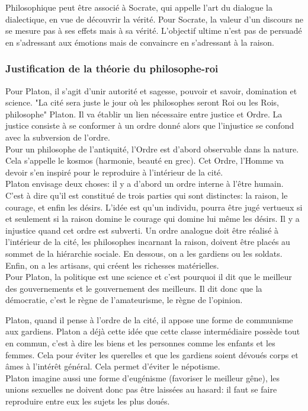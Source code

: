 \documentclass[10pt, a4paper, openany]{book}
\begin{document}
Philosophique peut être associé à Socrate, qui appelle l'art du dialogue la dialectique, en vue de découvrir la vérité. Pour Socrate, la valeur d'un discours ne se mesure pas à ses effets mais à sa vérité. L'objectif ultime n'est pas de persuadé en s'adressant aux émotions mais de convaincre en s'adressant à la raison. 

\subsubsection{Justification de la théorie du philosophe-roi}

Pour Platon, il s'agit d'unir autorité et sagesse, pouvoir et savoir, domination et science. "La cité sera juste le jour où les philosophes seront Roi ou les Rois, philosophe" Platon. Il va établir un lien nécessaire entre justice et Ordre. La justice consiste à se conformer à un ordre donné alors que l'injustice se confond avec la subversion de l'ordre. \\
Pour un philosophe de l'antiquité, l'Ordre est d'abord observable dans la nature. Cela s'appelle le kosmos (harmonie, beauté en grec). Cet Ordre, l'Homme va devoir s'en inspiré pour le reproduire à l'intérieur de la cité. \\
Platon envisage deux choses: il y a d'abord un ordre interne à l'être humain. C'est à dire qu'il est constitué de trois parties qui sont distinctes: la raison, le courage, et enfin les désirs. L'idée est qu'un individu, pourra être jugé vertueux si et seulement si la raison domine le courage qui domine lui même les désirs. Il y a injustice quand cet ordre est subverti. Un ordre analogue doit être réalisé à l'intérieur de la cité, les philosophes incarnant la raison, doivent être placés au sommet de la hiérarchie sociale. En dessous, on a les gardiens ou les soldats. Enfin, on a les artisans, qui créent les richesses matérielles. \\
Pour Platon, la politique est une science et c'est pourquoi il dit que le meilleur des gouvernements et le gouvernement des meilleurs. Il dit donc que la démocratie, c'est le règne de l'amateurisme, le règne de l'opinion. 


Platon, quand il pense à l'ordre de la cité, il appose une forme de communisme aux gardiens. Platon a déjà cette idée que cette classe intermédiaire possède tout en commun, c'est à dire les biens et les personnes comme les enfants et les femmes. Cela pour éviter les querelles et que les gardiens soient dévoués corps et âmes à l'intérêt général. Cela permet d'éviter le népotisme. \\
Platon imagine aussi une forme d'eugénisme (favoriser le meilleur gêne), les unions sexuelles ne doivent donc pas être laissées au hasard: il faut se faire reproduire entre eux les sujets les plus doués. 
\end{document}
